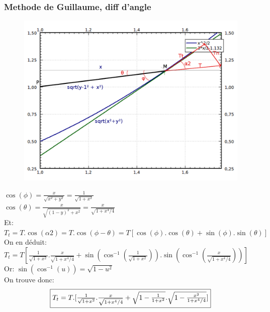 \documentclass[10pt,a4paper]{article}
\begin{document}
\subsubsection{Methode de Guillaume, diff d'angle}
\begin{figure}[H]
	\includegraphics[scale=0.35]{GraphMathZoomProjectionT2.png}
\end{figure} 
$\cos(\phi)=\frac{x}{\sqrt{x^2+y^2}}=\frac{1}{\sqrt{1+x^2}}$ \\

$\cos(\theta)=\frac{x}{\sqrt{(1-y)^2+x^2}}=\frac{x}{\sqrt{1+x^4/4}}$ \\
Et: 
$T_t=T.\cos(\alpha 2)=T.\cos(\phi - \theta)=T[\cos(\phi).\cos(\theta)+\sin(\phi).\sin(\theta)]$\\
On en déduit:\\
$T_t=T[\frac{1}{\sqrt{1+x^2}}.\frac{x}{\sqrt{1+x^4/4}} + \sin(\cos^{-1}(\frac{1}{\sqrt{1+x^2}})).\sin(\cos^{-1}(\frac{x}{\sqrt{1+x^4/4}}))]$\\
Or: $\sin(\cos^{-1}(u))=\sqrt{1-u^2}$\\
On trouve donc:\[\fbox{$T_t=T.[\frac{1}{\sqrt{1+x^2}}.\frac{x}{\sqrt{1+x^4/4}} + \sqrt{1-\frac{1}{1+x^2}}.\sqrt{1-\frac{x^2}{1+x^4/4}}]$}\]\\

\end{document}
